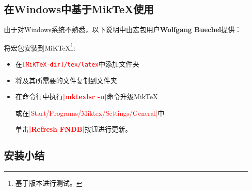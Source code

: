 \documentclass[../main.tex]{subfiles}
\begin{document}
\subsection{在Windows中基于MikTeX使用}

由于对Windows系统不熟悉，以下说明中由宏包用户\textbf{Wolfgang Buechel}提供：

将宏包安装到MiKTeX\footnote{基于版本进行测试。}:

\begin{itemize}\setlength{\itemsep}{10pt}
	\item 在\textcolor{red}{\texttt{[MiKTeX-dir]/tex/latex}}中添加文件夹
  \item 将及其所需要的文件复制到文件夹
  \item 在命令行中执行\textbf{\textcolor{red}{|mktexlsr -u|}}命令升级MikTeX

   或在\textcolor{red}{|Start/Programs/Miktex/Settings/General|}中

    单击\textbf{\textcolor{red}{|Refresh FNDB|}}按钮进行更新。
\end{itemize}

\subsection{安装小结}
\end{document}

